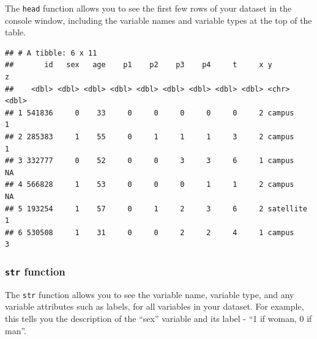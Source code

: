 \documentclass[]{book}
\newenvironment{Shaded}{\begin{snugshade}}{\end{snugshade}}
\newcommand{\KeywordTok}[1]{\textcolor[rgb]{0.13,0.29,0.53}{\textbf{#1}}}
\newcommand{\NormalTok}[1]{#1}
\newcommand{\OperatorTok}[1]{\textcolor[rgb]{0.81,0.36,0.00}{\textbf{#1}}}
\newcommand{\StringTok}[1]{\textcolor[rgb]{0.31,0.60,0.02}{#1}}
\begin{document}
The \texttt{head} function allows you to see the first few rows of your
dataset in the console window, including the variable names and variable
types at the top of the table.

\begin{Shaded}
\end{Shaded}

\begin{verbatim}
## # A tibble: 6 x 11
##       id   sex   age    p1    p2    p3    p4     t     x y             z
##    <dbl> <dbl> <dbl> <dbl> <dbl> <dbl> <dbl> <dbl> <dbl> <chr>     <dbl>
## 1 541836     0    33     0     0     0     0     0     2 campus        1
## 2 285383     1    55     0     1     1     1     3     2 campus        1
## 3 332777     0    52     0     0     3     3     6     1 campus       NA
## 4 566828     1    53     0     0     0     1     1     2 campus       NA
## 5 193254     1    57     0     1     2     3     6     2 satellite     1
## 6 530508     1    31     0     0     2     2     4     1 campus        3
\end{verbatim}

\hypertarget{str-function}{%
\subsubsection{\texorpdfstring{\texttt{str}
function}{str function}}\label{str-function}}

The \texttt{str} function allows you to see the variable name, variable
type, and any variable attributes such as labels, for all variables in
your dataset. For example, this tells you the description of the ``sex''
variable and its label - ``1 if woman, 0 if man''.

\begin{Shaded}
\end{Shaded}
\end{document}
